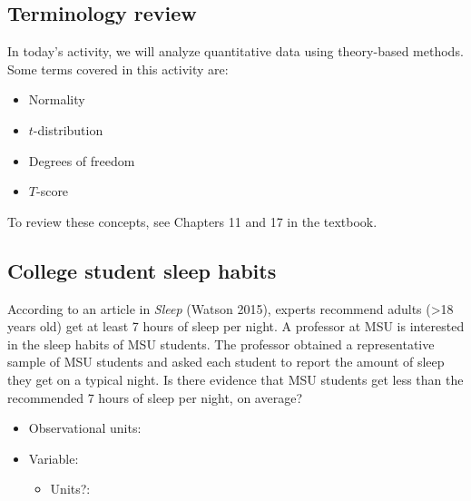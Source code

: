 \documentclass[
]{report}
\providecommand{\tightlist}{%
  \setlength{\itemsep}{0pt}\setlength{\parskip}{0pt}}
\begin{document}
\subsection{Terminology review}\label{terminology-review-10}

In today's activity, we will analyze quantitative data using theory-based methods. Some terms covered in this activity are:

\begin{itemize}
\item
  Normality
\item
  \(t\)-distribution
\item
  Degrees of freedom
\item
  \(T\)-score
\end{itemize}

To review these concepts, see Chapters 11 and 17 in the textbook.

\subsection{College student sleep habits}\label{college-student-sleep-habits}

According to an article in \emph{Sleep} ({Watson} 2015), experts recommend adults (\textgreater18 years old) get at least 7 hours of sleep per night. A professor at MSU is interested in the sleep habits of MSU students. The professor obtained a representative sample of MSU students and asked each student to report the amount of sleep they get on a typical night. Is there evidence that MSU students get less than the recommended 7 hours of sleep per night, on average?

\vspace{2mm}

\begin{itemize}
\tightlist
\item
  Observational units:
\end{itemize}

\vspace{2mm}

\begin{itemize}
\item
  Variable:

  \begin{itemize}
  \tightlist
  \item
    Units?:
  \end{itemize}
\end{itemize}

\vspace{2mm}
\end{document}
